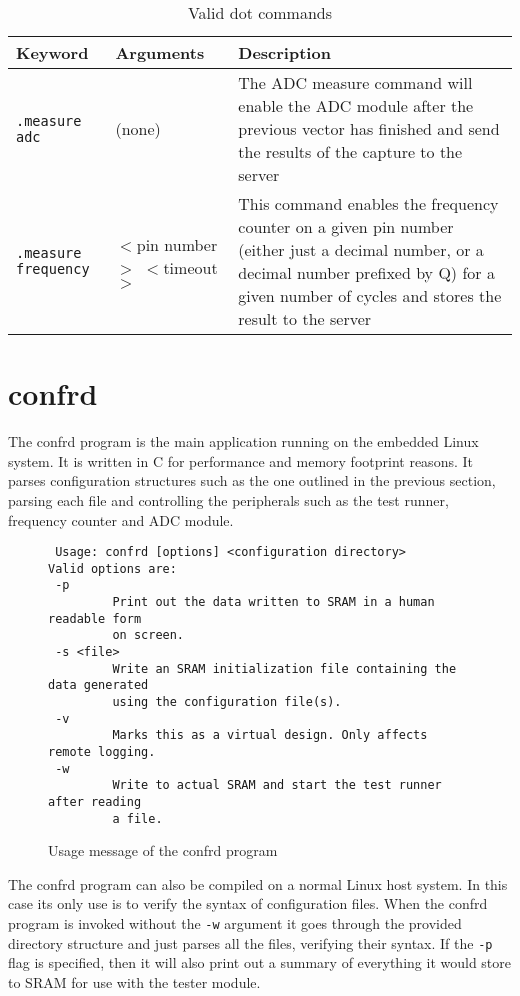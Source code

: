 \begin{table}[h!]
\centering
\begin{tabular}{ | l | l | p{5cm} | }
 \hline
   Keyword       & Arguments & Description \\
 \hline
   \texttt{.measure adc} & (none) & The ADC measure command will enable the ADC module after the previous vector has finished and send the results of the capture to the server \\
 \hline
   \texttt{.measure frequency} & $<$pin number$>$ $<$timeout$>$ & This command enables the frequency counter on a given pin number (either just a decimal number, or a decimal number prefixed by Q) for a given number of cycles and stores the result to the server\\
 \hline
\end{tabular}
\caption{Valid dot commands}
\label{table:dot_commands}
\end{table}


\newpage
\section{confrd}
The confrd program is the main application running on the embedded Linux system. It
is written in C for performance and memory footprint reasons.
It parses configuration structures such as the one outlined in the previous section, parsing
each file and controlling the peripherals such as the test runner, frequency counter and
ADC module.

\begin{figure}[h!]
\lstset{basicstyle=\scriptsize\ttfamily}
\begin{lstlisting}
 Usage: confrd [options] <configuration directory>
Valid options are:
 -p
         Print out the data written to SRAM in a human readable form
         on screen.
 -s <file>
         Write an SRAM initialization file containing the data generated
         using the configuration file(s).
 -v
         Marks this as a virtual design. Only affects remote logging.
 -w
         Write to actual SRAM and start the test runner after reading
         a file.
\end{lstlisting}
\caption{Usage message of the confrd program}
\end{figure}


The confrd program can also be compiled on a normal Linux host system. In this case its
only use is to verify the syntax of configuration files. When the confrd program is
invoked without the \texttt{-w} argument it goes through the provided directory
structure and just parses all the files, verifying their syntax. If the \texttt{-p} flag
is specified, then it will also print out a summary of everything it would store to SRAM for
use with the tester module.

